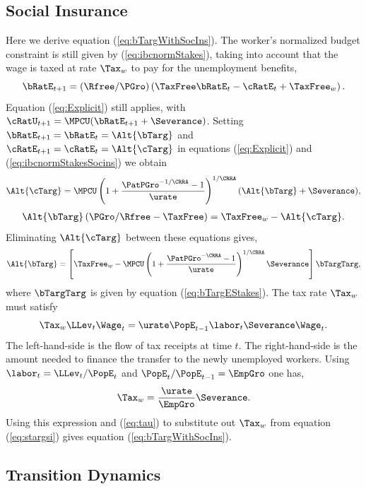 \documentclass[titlepage]{\econtex}\newcommand{\texname}{cjSOE}
\begin{document}
\subsection{Social Insurance}

Here we derive equation (\ref{eq:bTargWithSocIns}). The worker's normalized budget constraint is still given by (\ref{eq:ibcnormStakes}), taking into account that the wage is taxed at rate $\Tax_w$ to pay for the unemployment benefits,
\begin{equation}
\bRatE_{t+1} = (\Rfree/\PGro)\left(\TaxFree \bRatE_{t} -\cRatE_{t}+\TaxFree_w\right).
\label{eq:ibcnormStakesSocins}
\end{equation}
Equation (\ref{eq:Explicit}) still applies, with $\cRatU_{t+1}=\MPCU (\bRatE_{t+1}+\Severance)$. Setting $\bRatE_{t+1}=\bRatE_t=\Alt{\bTarg}$ and $\cRatE_{t+1}=\cRatE_t=\Alt{\cTarg}$ in equations (\ref{eq:Explicit}) and (\ref{eq:ibcnormStakesSocins}) we obtain
\begin{eqnarray*}
\Alt{\cTarg}= \MPCU \left(1+\frac{\PatPGro^{-1/\CRRA}-1}{\urate}\right)^{1/\CRRA}  (\Alt{\bTarg}+\Severance),
\end{eqnarray*}
\begin{eqnarray*}
\Alt{\bTarg} \left( \PGro /\Rfree -\TaxFree \right) = \TaxFree_w - \Alt{\cTarg}.
\end{eqnarray*}
Eliminating $\Alt{\cTarg}$ between these equations gives,
\begin{equation}
\Alt{\bTarg} = \left[ \TaxFree_w - \MPCU \left(1+\frac{\PatPGro^{-\CRRA}-1}{\urate}\right)^{1/\CRRA} \Severance \right] \bTargTarg,
\label{eq:stargsi}
\end{equation}
where $\bTargTarg$ is given by equation (\ref{eq:bTargEStakes}).
The tax rate $\Tax_w$ must satisfy
\begin{equation}
\Tax_w \LLev_t \Wage_t =\urate \PopE_{t-1} \labor_{t} \Severance \Wage_t. \label{eq:taxBalance}
\end{equation}
The left-hand-side is the flow of tax receipts at time $t$. The right-hand-side is the amount needed to finance the transfer to the newly unemployed workers. Using $\labor_{t}=\LLev_t /\PopE_t$ and $\PopE_t / \PopE_{t-1}= \EmpGro$ one has,
\begin{equation*}
\Tax_w = \frac{\urate}{\EmpGro} \Severance.
\end{equation*}
Using this expression and (\ref{eq:tau}) to substitute out $\Tax_w$ from equation (\ref{eq:stargsi}) gives equation (\ref{eq:bTargWithSocIns}).

\subsection{Transition Dynamics}
\end{document}
